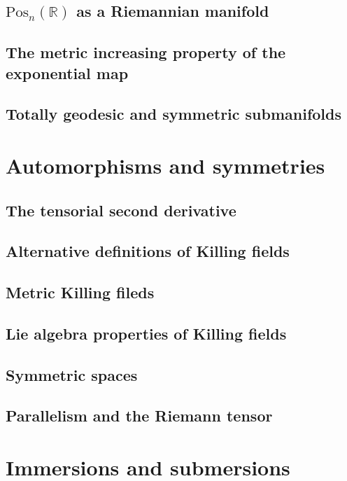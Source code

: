 \documentclass[a4paper]{article}
\newcommand{\R}{\mathbb{R}}
\begin{document}
\subsection{$\text{Pos}_n(\R)$ as a Riemannian manifold}

\subsection{The metric increasing property of the exponential map}

\subsection{Totally geodesic and symmetric submanifolds}

\section{Automorphisms and symmetries}

\subsection{The tensorial second derivative}

\subsection{Alternative definitions of Killing fields}

\subsection{Metric Killing fileds}

\subsection{Lie algebra properties of Killing fields}

\subsection{Symmetric spaces}

\subsection{Parallelism and the Riemann tensor}

\section{Immersions and submersions}
\end{document}
